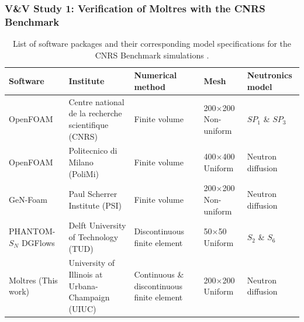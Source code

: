 \begin{frame}[noframenumbering]
  \frametitle{V\&V Study 1: Verification of Moltres with the CNRS Benchmark}
  \begin{table}
      \caption{List of software packages and their corresponding model
      specifications for the CNRS Benchmark simulations
      \cite{tiberga_results_2020}.}
      \centering
      \footnotesize
      \begin{tabular}{p{1.8cm} p{3.3cm} p{1.6cm} p{1cm} p{1.1cm}}
          \toprule
          Software & Institute & Numerical method & Mesh & Neutronics model \\
          \midrule
          OpenFOAM & Centre national de la recherche scientifique (CNRS) & Finite volume & 200$\times$200 \newline Non-uniform & $SP_1$ \& $SP_3$ \\
          OpenFOAM & Politecnico di Milano (PoliMi) & Finite volume & 400$\times$400 \newline Uniform & Neutron diffusion \\
          GeN-Foam & Paul Scherrer Institute (PSI) & Finite volume & 200$\times$200 \newline Non-uniform & Neutron diffusion \\
          PHANTOM-$S_N$ DGFlows & Delft University of Technology (TUD) & Discontinuous finite \newline element & 50$\times$50 \newline Uniform & $S_2$ \& $S_6$ \\
          Moltres (This work) & University of Illinois at Urbana-Champaign (UIUC) & Continuous \& discontinuous finite element & 200$\times$200 \newline Uniform & Neutron diffusion \\
          \bottomrule
      \end{tabular}
      \label{table:software}
  \end{table}
\end{frame}


